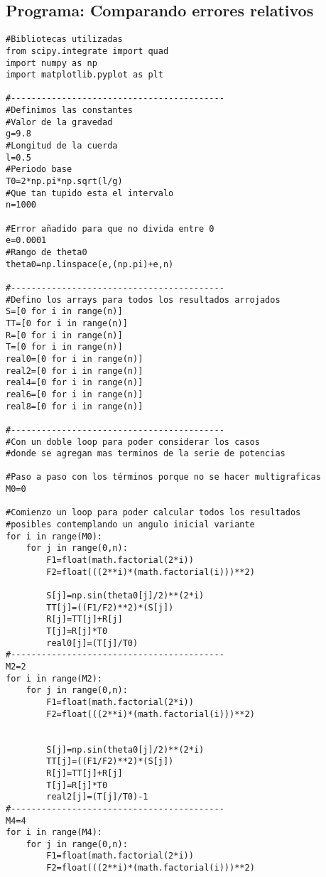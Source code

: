 \documentclass[12pt]{article}
\begin{document}
\subsection*{Programa: Comparando errores relativos}

{\color{RoyalPurple}\begin{verbatim}
#Bibliotecas utilizadas
from scipy.integrate import quad
import numpy as np
import matplotlib.pyplot as plt

#------------------------------------------
#Definimos las constantes 
#Valor de la gravedad
g=9.8        
#Longitud de la cuerda
l=0.5  
#Periodo base
T0=2*np.pi*np.sqrt(l/g)
#Que tan tupido esta el intervalo
n=1000

#Error añadido para que no divida entre 0
e=0.0001
#Rango de theta0 
theta0=np.linspace(e,(np.pi)+e,n) 

#------------------------------------------
#Defino los arrays para todos los resultados arrojados
S=[0 for i in range(n)]
TT=[0 for i in range(n)]
R=[0 for i in range(n)]
T=[0 for i in range(n)]
real0=[0 for i in range(n)]
real2=[0 for i in range(n)]
real4=[0 for i in range(n)]
real6=[0 for i in range(n)]
real8=[0 for i in range(n)]

#------------------------------------------
#Con un doble loop para poder considerar los casos
#donde se agregan mas terminos de la serie de potencias

#Paso a paso con los términos porque no se hacer multigraficas
M0=0

#Comienzo un loop para poder calcular todos los resultados 
#posibles contemplando un angulo inicial variante
for i in range(M0):
    for j in range(0,n):
        F1=float(math.factorial(2*i))
        F2=float(((2**i)*(math.factorial(i)))**2)
        
        S[j]=np.sin(theta0[j]/2)**(2*i)
        TT[j]=((F1/F2)**2)*(S[j])
        R[j]=TT[j]+R[j]
        T[j]=R[j]*T0
        real0[j]=(T[j]/T0)
#------------------------------------------        
M2=2
for i in range(M2):
    for j in range(0,n):
        F1=float(math.factorial(2*i))
        F2=float(((2**i)*(math.factorial(i)))**2)
        
        
        S[j]=np.sin(theta0[j]/2)**(2*i)
        TT[j]=((F1/F2)**2)*(S[j])
        R[j]=TT[j]+R[j]
        T[j]=R[j]*T0
        real2[j]=(T[j]/T0)-1
#------------------------------------------        
M4=4
for i in range(M4):
    for j in range(0,n):
        F1=float(math.factorial(2*i))
        F2=float(((2**i)*(math.factorial(i)))**2)
        

\end{verbatim}}
\end{document}

